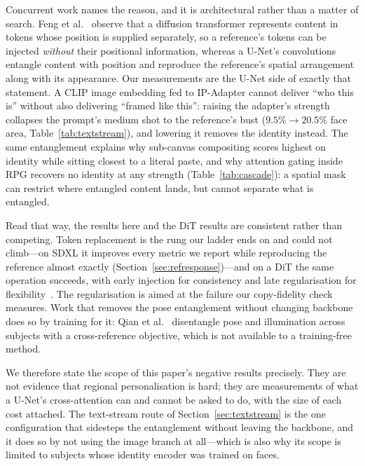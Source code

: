 \documentclass[10pt,twocolumn,letterpaper]{article}
\begin{document}
Concurrent work names the reason, and it is architectural rather than a matter
of search.  Feng et al.~\cite{feng2026personalize} observe that a diffusion
transformer represents content in tokens whose position is supplied separately,
so a reference's tokens can be injected \emph{without} their positional
information, whereas a U-Net's convolutions entangle content with position and
reproduce the reference's spatial arrangement along with its appearance.  Our
measurements are the U-Net side of exactly that statement.  A CLIP image
embedding fed to IP-Adapter cannot deliver ``who this is'' without also
delivering ``framed like this'': raising the adapter's strength collapses the
prompt's medium shot to the reference's bust ($9.5\% \to 20.5\%$ face area,
Table~\ref{tab:textstream}), and lowering it removes the identity instead.  The
same entanglement explains why sub-canvas compositing scores highest on
identity while sitting closest to a literal paste, and why attention gating
inside RPG recovers no identity at any strength (Table~\ref{tab:cascade}): a
spatial mask can restrict where entangled content lands, but cannot separate
what is entangled.

Read that way, the results here and the DiT results are consistent rather than
competing.  Token replacement is the rung our ladder ends on and could not
climb---on SDXL it improves every metric we report while reproducing the
reference almost exactly (Section~\ref{sec:refresponse})---and on a DiT the
same operation succeeds, with early injection for consistency and late
regularisation for flexibility~\cite{feng2026personalize}.  The regularisation
is aimed at the failure our copy-fidelity check measures.  Work that removes
the pose entanglement without changing backbone does so by training for it:
Qian et al.~\cite{qian2025canvascomposer} disentangle pose and illumination
across subjects with a cross-reference objective, which is not available to a
training-free method.

We therefore state the scope of this paper's negative results precisely.  They
are not evidence that regional personalisation is hard; they are measurements
of what a U-Net's cross-attention can and cannot be asked to do, with the size
of each cost attached.  The text-stream route of
Section~\ref{sec:textstream} is the one configuration that sidesteps the
entanglement without leaving the backbone, and it does so by not using the
image branch at all---which is also why its scope is limited to subjects whose
identity encoder was trained on faces.
\end{document}
